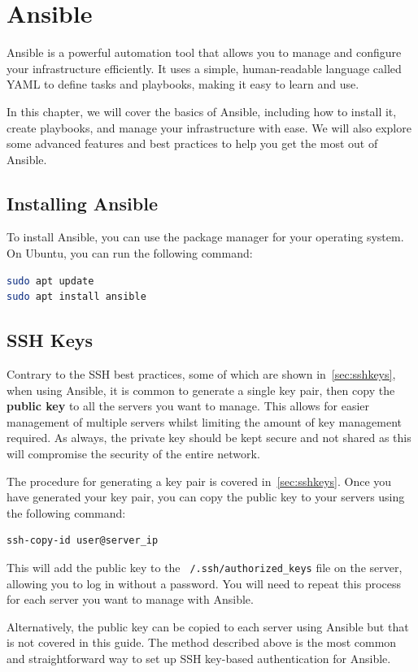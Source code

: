 \chapter{Ansible}
\label{chp:ansible}

Ansible is a powerful automation tool that allows you to manage and configure your infrastructure efficiently. It uses a simple, human-readable language called YAML to define tasks and playbooks, making it easy to learn and use.

In this chapter, we will cover the basics of Ansible, including how to install it, create playbooks, and manage your infrastructure with ease. We will also explore some advanced features and best practices to help you get the most out of Ansible.

\section{Installing Ansible}
\label{sec:installing-ansible}

To install Ansible, you can use the package manager for your operating system. On Ubuntu, you can run the following command:

\begin{lstlisting}[language=bash]
sudo apt update
sudo apt install ansible
\end{lstlisting}

\section{SSH Keys}
\label{sec:Ansible-ssh-keys}

Contrary to the SSH best practices, some of which are shown in~\autoref{sec:sshkeys}, when using Ansible, it is common to generate a single key pair, then copy the \textbf{public key} to all the servers you want to manage. This allows for easier management of multiple servers whilst limiting the amount of key management required. As always, the private key should be kept secure and not shared as this will compromise the security of the entire network.

The procedure for generating a key pair is covered in~\autoref{sec:sshkeys}. Once you have generated your key pair, you can copy the public key to your servers using the following command:

\begin{lstlisting}[language=bash]
ssh-copy-id user@server_ip
\end{lstlisting}

This will add the public key to the \texttt{~/.ssh/authorized\_keys} file on the server, allowing you to log in without a password. You will need to repeat this process for each server you want to manage with Ansible.

Alternatively, the public key can be copied to each server using Ansible but that is not covered in this guide. The method described above is the most common and straightforward way to set up SSH key-based authentication for Ansible.
